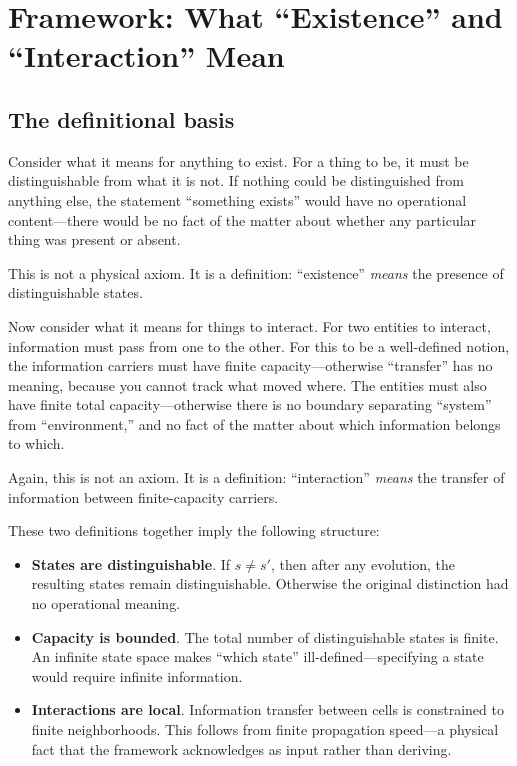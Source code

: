 \documentclass[reprint]{revtex4-2}
\begin{document}
\section{Framework: What ``Existence'' and ``Interaction'' Mean}

\subsection{The definitional basis}

Consider what it means for anything to exist. For a thing to be, it must be distinguishable from what it is not. If nothing could be distinguished from anything else, the statement ``something exists'' would have no operational content---there would be no fact of the matter about whether any particular thing was present or absent.

This is not a physical axiom. It is a definition: ``existence'' \emph{means} the presence of distinguishable states.

Now consider what it means for things to interact. For two entities to interact, information must pass from one to the other. For this to be a well-defined notion, the information carriers must have finite capacity---otherwise ``transfer'' has no meaning, because you cannot track what moved where. The entities must also have finite total capacity---otherwise there is no boundary separating ``system'' from ``environment,'' and no fact of the matter about which information belongs to which.

Again, this is not an axiom. It is a definition: ``interaction'' \emph{means} the transfer of information between finite-capacity carriers.

These two definitions together imply the following structure:

\begin{itemize}
\item \textbf{States are distinguishable}. If $s\neq s'$, then after any evolution, the resulting states remain distinguishable. Otherwise the original distinction had no operational meaning.
\item \textbf{Capacity is bounded}. The total number of distinguishable states is finite. An infinite state space makes ``which state'' ill-defined---specifying a state would require infinite information.
\item \textbf{Interactions are local}. Information transfer between cells is constrained to finite neighborhoods. This follows from finite propagation speed---a physical fact that the framework acknowledges as input rather than deriving.
\end{itemize}
\end{document}
